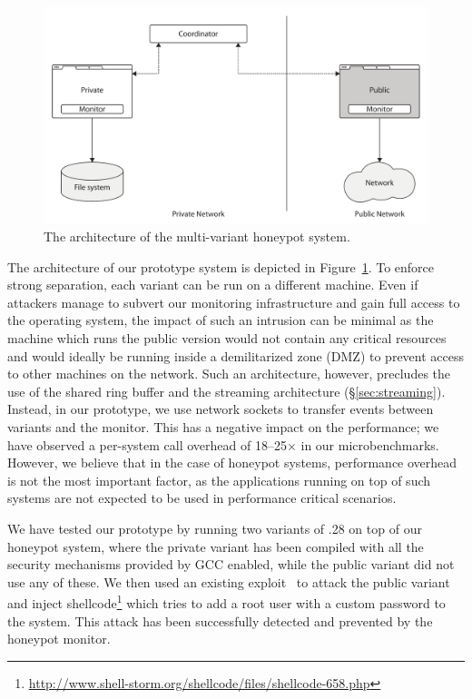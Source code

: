 \begin{figure}[t]
  \begin{center}
    \includegraphics[width=0.75\columnwidth]{applications/figures/honeypot}
    \caption{The architecture of the multi-variant honeypot system.}
    \label{fig:security-honeypot}
  \end{center}
\end{figure}

The architecture of our prototype system is depicted in
Figure~\ref{fig:security-honeypot}.  To enforce strong separation, each variant
can be run on a different machine. Even if attackers manage to subvert our
monitoring infrastructure and gain full access to the operating system, the
impact of such an intrusion can be minimal as the machine which runs the public
version would not contain any critical resources and would ideally be running
inside a demilitarized zone (DMZ) to prevent access to other machines on the
network.  Such an architecture, however, precludes the use of the shared ring
buffer and the streaming architecture (\S\ref{sec:streaming}). Instead, in our
prototype, we use network sockets to transfer events between variants and the
monitor. This has a negative impact on the performance; we have observed a
per-system call overhead of \numrange{18}{25}$\times$ in our microbenchmarks.
However, we believe that in the case of honeypot systems, performance overhead
is not the most important factor, as the applications running on top of such
systems are not expected to be used in performance critical scenarios.

We have tested our prototype by running two variants of .28 on
top of our honeypot system, where the private variant has been compiled with
all the security mechanisms provided by GCC enabled, while the public variant
did not use any of these.
We then used an existing exploit~\cite{erickson:hacking-networking} to attack the public variant and
inject shellcode\footnote{\url{http://www.shell-storm.org/shellcode/files/shellcode-658.php}}
which tries to add a root user with a custom password to the system. This
attack has been successfully detected and prevented by the honeypot monitor.
